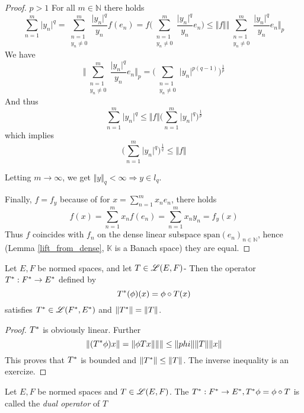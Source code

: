 \begin{proof}
	\underline{$p>1$} For all $m \in \mathbb{N}$ there holds
	\[
		\sum_{n=1}^m \vert y_n \vert^q = \sum_{\substack{ n=1 \\ y_n \neq 0}}^m\frac{\vert y_n \vert^q}{y_n}f(e_n) = 
		f\Big(\sum_{\substack{ n=1 \\ y_n \neq 0}}^m\frac{\vert y_n \vert^q}{y_n}e_n \Big) 
		\leq \Vert f \Vert  \Vert\sum_{\substack{ n=1\\ y_n \neq 0}}^m\frac{\vert y_n \vert^q}{y_n}e_n\Vert_p
	\]
	We have 
	\[
		\Vert \sum_{\substack{ n=1 \\ y_n \neq 0}}^m\frac{\vert y_n \vert^q}{y_n}e_n \Vert_p = 
		\Big( \sum_{\substack{ n=1 \\ y_n \neq 0}}\vert y_n \vert^{p(q-1)} \Big)^{\frac{1}{p}}
	\]
	And thus
	\[
		\sum_{n=1}^m \vert y_n \vert^q \leq \Vert f \Vert \Big(\sum_{n=1}^m \vert y_n \vert^q \Big)^{ \frac{1}{p}}
	\]
	which implies
	\[
		\Big(  \sum_{n=1}^m \vert y_n \vert^q \Big)^{\frac{1}{q}} \leq \Vert f \Vert
	\]
	
	Letting $m \to \infty$, we get $\Vert y \Vert_q <\infty \Rightarrow y \in l_q$.
	
	Finally, $f=f_y$ because of for $x= \sum_{n=1}^mx_n e_n$, there holds
	\[
		f(x) = \sum_{n=1}^m x_n f(e_n) = \sum_{n=1}^m x_ny_n =f_y(x)
	\]
	Thus $f$ coincides with $f_n$ on the dense linear subspace $\text{span} (e_n)_{n\in \mathbb{N}}$, 
	hence (Lemma \eqref{lift_from_dense}, $\mathbb{K}$ is a Banach space) they are equal.
\end{proof}

\begin{lemma} \label{dual lemma}
	Let $E,F$ be normed spaces, and let $T \in \mathscr L(E,F)$- Then the operator ${T}^{\ast}: {F}^{\ast} \to {E}^{\ast}$ defined by
		\[
		{T}^{\ast}(\phi)(x)= \phi \circ T(x)
		\]
	satisfies ${T}^{\ast} \in \mathscr L({F}^{\ast},{E}^{\ast})$ and $\Vert {T}^{\ast} \Vert=\Vert T \Vert$.
\end{lemma}

\begin{proof}
	${T}^{\ast}$ is obviously linear. Further
	\[
		\Vert ({T}^{\ast}\phi)x \Vert = \Vert \phi Tx \Vert \Vert \Vert \leq \Vert phi \Vert\Vert T \Vert\Vert x \Vert
	\]
	This proves that ${T}^{\ast}$ is bounded and $\Vert {T}^{\ast} \Vert\leq \Vert T \Vert$. The inverse inequality is an exercize.
\end{proof}

\begin{def} \label{ dual def}
	Let $E,F$ be normed spaces and $T \in \mathscr L(E,F)$. The ${T}^{\ast} : {F}^{\ast} \to {E}^{\ast} , {T}^{\ast}\phi= \phi \circ T$ is 
	called the \emph{dual operator} of $T$
\end{def}
